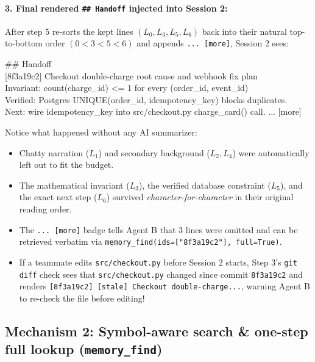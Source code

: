 \documentclass[11pt,a4paper]{article}
\begin{document}
\paragraph{3. Final rendered \texttt{\#\# Handoff} injected into Session 2:}
After step 5 re-sorts the kept lines $(L_0, L_3, L_5, L_6)$ back into their natural top-to-bottom order $(0 < 3 < 5 < 6)$ and appends \texttt{... [more]}, Session 2 sees:

\begin{tcolorbox}[colback=codebg,colframe=gray!40,boxrule=0.5pt,arc=3pt,fontupper=\ttfamily\scriptsize]
\#\# Handoff\\
{[8f3a19c2]} Checkout double-charge root cause and webhook fix plan\\
Invariant: count(charge\_id) <= 1 for every (order\_id, event\_id)\\
Verified: Postgres UNIQUE(order\_id, idempotency\_key) blocks duplicates.\\
Next: wire idempotency\_key into src/checkout.py charge\_card() call. ... {[more]}
\end{tcolorbox}

Notice what happened without any AI summarizer:
\begin{itemize}[leftmargin=1.5em,itemsep=1pt]
  \item Chatty narration ($L_1$) and secondary background ($L_2, L_4$) were automatically left out to fit the budget.
  \item The mathematical invariant ($L_3$), the verified database constraint ($L_5$), and the exact next step ($L_6$) survived \emph{character-for-character} in their original reading order.
  \item The \texttt{... [more]} badge tells Agent B that $3$ lines were omitted and can be retrieved verbatim via \texttt{memory\_find(ids=["8f3a19c2"], full=True)}.
  \item If a teammate edits \texttt{src/checkout.py} before Session 2 starts, Step 3's \texttt{git diff} check sees that \texttt{src/checkout.py} changed since commit \texttt{8f3a19c2} and renders \texttt{[8f3a19c2] [stale] Checkout double-charge...}, warning Agent B to re-check the file before editing!
\end{itemize}

\subsection{Mechanism 2: Symbol-aware search \& one-step full lookup (\texttt{memory\_find})}
\end{document}
